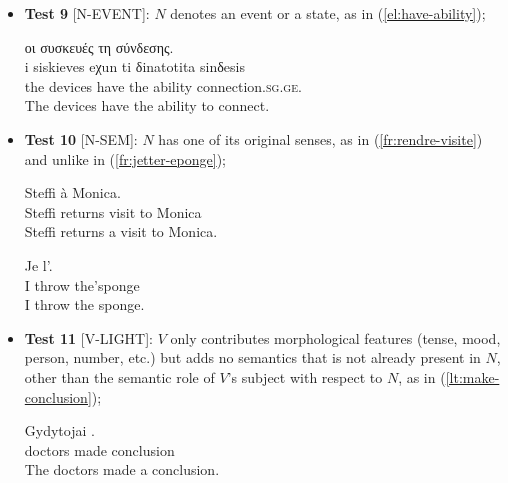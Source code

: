\documentclass[output=paper,
modfonts,
]{langscibook}
\begin{document}
\begin{itemize}
\item[] \textbf{Test 9} [N-EVENT]: $N$ denotes an event or a state, as in (\ref{el:have-ability}); %

\ea \label{el:have-ability}
\settowidth {}
\glll οι συσκευές  τη \underline{} σύνδεσης.\\
i siskieves eχun ti δinatotita sinδesis \\
the devices have the ability connection.\textsc{sg.ge}.\\ 
\glt The devices have the ability to connect. 
\z

\item[] \textbf{Test 10} [N-SEM]: $N$ has one of its original senses, as in (\ref{fr:rendre-visite}) and unlike in (\ref{fr:jetter-eponge});

\ea \label{fr:rendre-visite}
\settowidth {}
\gll Steffi   à Monica. \\
Steffi returns visit to Monica\\ 
\glt Steffi returns a visit to Monica. 
\z

\ea \label{fr:jetter-eponge}
\settowidth {}
\gll Je  l'. \\
I throw the'sponge\\  
\glt I throw the sponge. 
\z

\item[] \textbf{Test 11} [V-LIGHT]: $V$ only contributes morphological features (tense, mo\-od, person, number, etc.) but 
adds no semantics that is not already present in $N$, other than the semantic role of $V$'s subject with respect to $N$, as in (\ref{lt:make-conclusion});

\ea \label{lt:make-conclusion}
\settowidth {}
\gll Gydytojai  . \\
doctors made conclusion\\ 
\glt The doctors made a conclusion. 
\z


\end{itemize}
\end{document}
